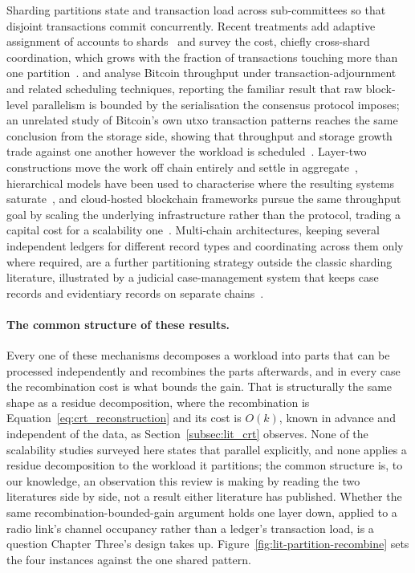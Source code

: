 Sharding partitions state and transaction load across sub-committees so that
disjoint transactions commit concurrently. Recent treatments add adaptive
assignment of accounts to shards~\cite{horvath2025assistedsharding} and survey
the cost, chiefly cross-shard coordination, which grows with the fraction of
transactions touching more than one partition~\cite{anonndscalabilitysolutions}.
\textcite{maiwada2024techniquesimprove} and
\textcite{maiwada2025blockchainscalability} analyse Bitcoin throughput under
transaction-adjournment and related scheduling techniques, reporting the
familiar result that raw block-level parallelism is bounded by the
serialisation the consensus protocol imposes; an unrelated study of Bitcoin's
own \gls{utxo} transaction patterns reaches the same conclusion from the
storage side, showing that throughput and storage growth trade against one
another however the workload is scheduled~\cite{melo2024unlockingblockchain}.
Layer-two constructions move the work off chain entirely and settle in
aggregate~\cite{patel2023blockchainlayer}, hierarchical models have been
used to characterise where the resulting systems
saturate~\cite{sadath2024scalabilityperformance}, and cloud-hosted
blockchain frameworks pursue the same throughput goal by scaling the
underlying infrastructure rather than the protocol, trading a capital cost
for a scalability
one~\cite{anonndoptimizedcloud}. Multi-chain architectures, keeping
several independent ledgers for different record types and coordinating
across them only where required, are a further partitioning strategy
outside the classic sharding literature, illustrated by a judicial
case-management system that keeps case records and evidentiary records on
separate chains~\cite{alyas2025multiblockchain}.

\paragraph{The common structure of these results.}

Every one of these mechanisms decomposes a workload into parts that can be
processed independently and recombines the parts afterwards, and in every case
the recombination cost is what bounds the gain. That is structurally the same
shape as a residue decomposition, where the recombination is
Equation~\ref{eq:crt_reconstruction} and its cost is $O(k)$, known in advance
and independent of the data, as Section~\ref{subsec:lit_crt} observes. None of
the scalability studies surveyed here states that parallel explicitly, and
none applies a residue decomposition to the workload it partitions; the
common structure is, to our knowledge, an observation this review is making
by reading the two literatures side by side, not a result either literature
has published. Whether the same recombination-bounded-gain argument holds one
layer down, applied to a radio link's channel occupancy rather than a
ledger's transaction load, is a question Chapter Three's design takes up.
Figure~\ref{fig:lit-partition-recombine} sets the four instances against the
one shared pattern.

